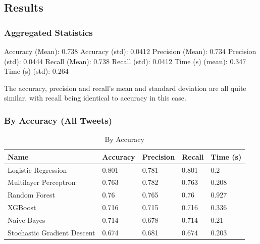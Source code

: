 \documentclass{article}
\begin{document}
\subsection{Results}

\subsubsection{Aggregated Statistics}

Accuracy (Mean): 0.738
Accuracy (std): 0.0412
Precision (Mean): 0.734
Precision (std): 0.0444
Recall (Mean): 0.738
Recall (std): 0.0412
Time (s) (mean): 0.347
Time (s) (std): 0.264

The accuracy, precision and recall's mean and standard deviation are all quite similar, with recall being identical to accuracy in this case.

\subsubsection{By Accuracy (All Tweets)}

\begin{table}[h!]
	\begin{center}
		\caption{By Accuracy}
		\label{tab:table1}
		\begin{tabular}{l|l|l|l|l}
			\textbf{Name}               & \textbf{Accuracy} & \textbf{Precision} & \textbf{Recall} & \textbf{Time (s)} \\
			\hline
			Logistic Regression         & 0.801             & 0.781              & 0.801           & 0.2               \\
			Multilayer Perceptron       & 0.763             & 0.782              & 0.763           & 0.208             \\
			Random Forest               & 0.76              & 0.765              & 0.76            & 0.927             \\
			XGBoost                     & 0.716             & 0.715              & 0.716           & 0.336             \\
			Naive Bayes                 & 0.714             & 0.678              & 0.714           & 0.21              \\
			Stochastic Gradient Descent & 0.674             & 0.681              & 0.674           & 0.203             \\
		\end{tabular}
	\end{center}
\end{table}
\end{document}
